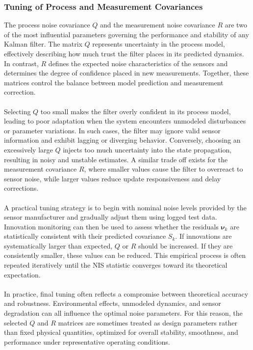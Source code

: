 \subsubsection{Tuning of Process and Measurement Covariances}
The process noise covariance $Q$ and the measurement noise covariance $R$ are two of the most influential parameters governing the performance and stability of any Kalman filter. The matrix $Q$ represents uncertainty in the process model, effectively describing how much trust the filter places in its predicted dynamics. In contrast, $R$ defines the expected noise characteristics of the sensors and determines the degree of confidence placed in new measurements. Together, these matrices control the balance between model prediction and measurement correction.  
\\ \\
Selecting $Q$ too small makes the filter overly confident in its process model, leading to poor adaptation when the system encounters unmodeled disturbances or parameter variations. In such cases, the filter may ignore valid sensor information and exhibit lagging or diverging behavior. Conversely, choosing an excessively large $Q$ injects too much uncertainty into the state propagation, resulting in noisy and unstable estimates. A similar trade off exists for the measurement covariance $R$, where smaller values cause the filter to overreact to sensor noise, while larger values reduce update responsiveness and delay corrections.  
\\ \\
A practical tuning strategy is to begin with nominal noise levels provided by the sensor manufacturer and gradually adjust them using logged test data. Innovation monitoring can then be used to assess whether the residuals $\boldsymbol{\nu}_k$ are statistically consistent with their predicted covariance $S_k$. If innovations are systematically larger than expected, $Q$ or $R$ should be increased. If they are consistently smaller, these values can be reduced. This empirical process is often repeated iteratively until the NIS statistic converges toward its theoretical expectation.  
\\ \\
In practice, final tuning often reflects a compromise between theoretical accuracy and robustness. Environmental effects, unmodeled dynamics, and sensor degradation can all influence the optimal noise parameters. For this reason, the selected $Q$ and $R$ matrices are sometimes treated as design parameters rather than fixed physical quantities, optimized for overall stability, smoothness, and performance under representative operating conditions.



